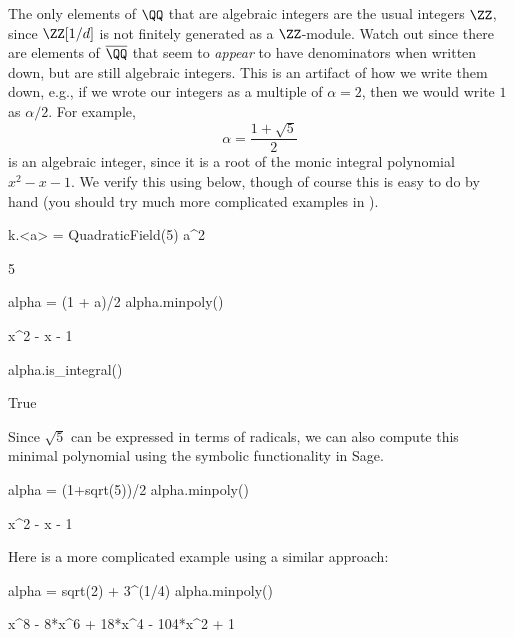 The only elements of $\QQ$ that are algebraic integers are the usual
integers $\ZZ$, since $\ZZ[1/d]$ is not finitely generated as a $\ZZ$-module.
Watch out since there are elements of $\overline{\QQ}$ that seem to {\em appear}
to have denominators when written down, but are still algebraic integers.
This is an artifact of how we write them down, e.g., if we wrote
our integers as a multiple of $\alpha=2$, then we would write $1$
as $\alpha/2$. For example,
\[
  \alpha = \frac{1+\sqrt{5}}{2}
\]
is an algebraic integer, since it is a root of the monic integral
polynomial $x^2 - x - 1$.  We verify this using {\Sage} below,
though of course this is easy to do by hand (you should try
much more complicated examples in {\Sage}).

\begin{sagecode}
\begin{sagecell}
k.<a> = QuadraticField(5)
a^2
\end{sagecell}
\begin{sageout}
5
\end{sageout}
\begin{sagecell}
alpha = (1 + a)/2
alpha.minpoly()
\end{sagecell}
\begin{sageout}
x^2 - x - 1
\end{sageout}
\begin{sagecell}
alpha.is_integral()
\end{sagecell}
\begin{sageout}
True
\end{sageout}
\end{sagecode}

Since $\sqrt{5}$ can be expressed in terms of radicals, we can also
compute this minimal polynomial using the symbolic functionality in
Sage.
\begin{sagecode}
\begin{sagecell}
alpha = (1+sqrt(5))/2
alpha.minpoly()
\end{sagecell}
\begin{sageout}
x^2 - x - 1
\end{sageout}
Here is a more complicated example using a similar approach:
\begin{sagecell}
alpha = sqrt(2) + 3^(1/4)
alpha.minpoly()
\end{sagecell}
\begin{sageout}
x^8 - 8*x^6 + 18*x^4 - 104*x^2 + 1
\end{sageout}
\end{sagecode}

